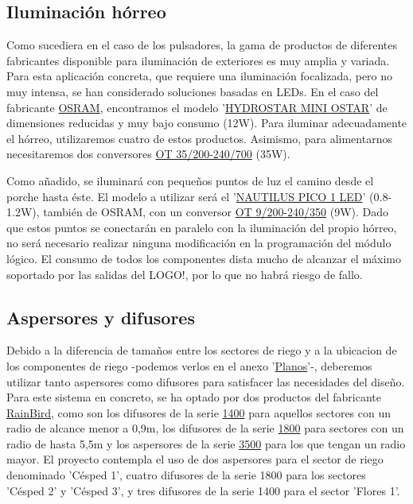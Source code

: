 \subsection{Iluminaci\'on h\'orreo}

Como sucediera en el caso de los pulsadores, la gama de productos de diferentes fabricantes disponible para iluminaci\'on de exteriores es muy amplia y variada. Para esta aplicaci\'on concreta, que requiere una iluminaci\'on focalizada, pero no muy intensa, se han considerado soluciones basadas en LEDs. En el caso del fabricante \hyperref[OSRAM]{OSRAM}, encontramos el modelo '\hyperref[LED]{HYDROSTAR MINI OSTAR}' de dimensiones reducidas y muy bajo consumo (12W). Para iluminar adecuadamente el h\'orreo, utilizaremos cuatro de estos productos. Asimismo, para alimentarnos necesitaremos dos conversores \hyperref[OT]{OT 35/200-240/700} (35W).

Como añadido, se iluminar\'a con pequeños puntos de luz el camino desde el porche hasta \'este. El modelo a utilizar ser\'a el '\hyperref[LED]{NAUTILUS PICO 1 LED}' (0.8-1.2W), tambi\'en de OSRAM, con un conversor \hyperref[OT]{OT 9/200-240/350} (9W). Dado que estos puntos se conectar\'an en paralelo con la iluminaci\'on del propio h\'orreo, no ser\'a necesario realizar ninguna modificaci\'on en la programaci\'on del m\'odulo l\'ogico. El consumo de todos los componentes dista mucho de alcanzar el m\'aximo soportado por las salidas del LOGO!, por lo que no habr\'a riesgo de fallo.

\subsection{Aspersores y difusores}

Debido a la diferencia de tamaños entre los sectores de riego y a la ubicacion de los componentes de riego -podemos verlos en el anexo '\hyperref[Planos]{Planos}'-, deberemos utilizar tanto aspersores como difusores para satisfacer las necesidades del diseño. Para este sistema en concreto, se ha optado por dos productos del fabricante \hyperref[RainBird]{RainBird}, como son los difusores de la serie \hyperref[1400]{1400} para aquellos sectores con un radio de alcance menor a 0,9m, los difusores de la serie \hyperref[1800]{1800} para sectores con un radio de hasta 5,5m y los aspersores de la serie \hyperref[3500]{3500} para los que tengan un radio mayor. El proyecto contempla el uso de dos aspersores para el sector de riego denominado 'C\'esped 1', cuatro difusores de la serie 1800 para los sectores 'C\'esped 2' y 'C\'esped 3', y tres difusores de la serie 1400 para el sector 'Flores 1'.

